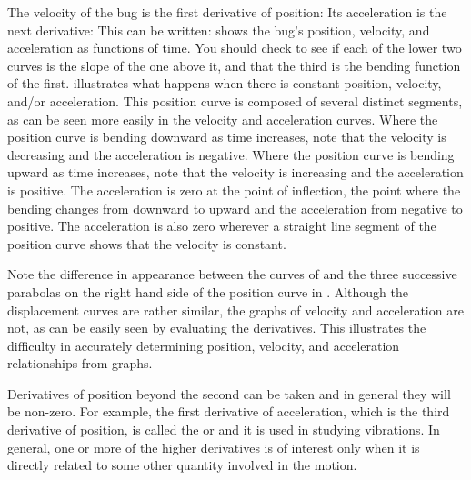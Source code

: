 {The velocity of the bug is the first derivative of position:
%
%
%
Its acceleration is the next derivative:
%
%
This can be written:
%
%
 shows the bug's position, velocity, and acceleration as functions
of time.
You should check to see if each of the lower two curves is the slope of the
one above it, and that the third is the bending function of the first.
 illustrates what happens when there is constant position,
velocity, and/or acceleration.
This position curve is composed of several distinct segments, as can be seen
more easily in the velocity and acceleration curves.
%
%
Where the position curve is bending downward as time increases, note that
the velocity is decreasing and the acceleration is negative.
Where the position curve is bending upward as time increases, note that
the velocity is increasing and the acceleration is positive.
The acceleration is zero at the point of inflection, the point where
the bending changes from downward to upward and the acceleration from
negative to positive.
The acceleration is also zero wherever a straight line segment of the
position curve shows that the velocity is constant.

Note the difference in appearance between the curves of 
and the three successive parabolas on the right hand side of the
position curve in .
%
%
Although the displacement curves are rather similar, the graphs of
velocity and acceleration are not, as can be easily seen by evaluating the
derivatives.
This illustrates the difficulty in accurately determining
position, velocity, and acceleration relationships from graphs.

Derivatives of position beyond the second can be taken and in general they
will be non-zero.
For example, the first derivative of acceleration, which is the third
derivative of position, is called the  or  and it is used in
studying vibrations.
In general, one or more of the higher derivatives is of interest only when
it is directly related to some other quantity involved in the motion.

}
